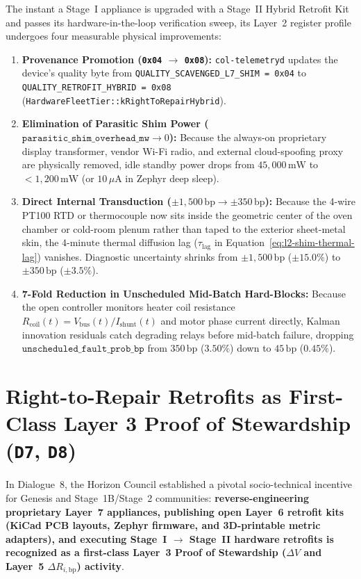 The instant a Stage~I appliance is upgraded with a Stage~II Hybrid Retrofit Kit and passes its hardware-in-the-loop verification sweep, its Layer~2 register profile undergoes four measurable physical improvements:
\begin{enumerate}
    \item \textbf{Provenance Promotion (\texttt{0x04} $\to$ \texttt{0x08}):} \texttt{col-telemetryd} updates the device's quality byte from \texttt{QUALITY\_SCAVENGED\_L7\_SHIM = 0x04} to \texttt{QUALITY\_RETROFIT\_HYBRID = 0x08} (\texttt{HardwareFleetTier::kRightToRepairHybrid}).
    \item \textbf{Elimination of Parasitic Shim Power ($\mathtt{parasitic\_shim\_overhead\_mw} \to 0$):} Because the always-on proprietary display transformer, vendor Wi-Fi radio, and external cloud-spoofing proxy are physically removed, idle standby power drops from $45{,}000\,\mathrm{mW}$ to $< 1{,}200\,\mathrm{mW}$ (or $10\,\mu\mathrm{A}$ in Zephyr deep sleep).
    \item \textbf{Direct Internal Transduction ($\pm 1{,}500\,\mathrm{bp} \to \pm 350\,\mathrm{bp}$):} Because the 4-wire PT100 RTD or thermocouple now sits inside the geometric center of the oven chamber or cold-room plenum rather than taped to the exterior sheet-metal skin, the $4\text{-minute}$ thermal diffusion lag ($\tau_{\mathrm{lag}}$ in Equation~\eqref{eq:l2-shim-thermal-lag}) vanishes. Diagnostic uncertainty shrinks from $\pm 1{,}500\,\mathrm{bp}$ ($\pm 15.0\%$) to $\pm 350\,\mathrm{bp}$ ($\pm 3.5\%$).
    \item \textbf{7-Fold Reduction in Unscheduled Mid-Batch Hard-Blocks:} Because the open controller monitors heater coil resistance $R_{\mathrm{coil}}(t) = V_{\mathrm{bus}}(t)/I_{\mathrm{shunt}}(t)$ and motor phase current directly, Kalman innovation residuals catch degrading relays before mid-batch failure, dropping $\mathtt{unscheduled\_fault\_prob\_bp}$ from $350\,\mathrm{bp}$ ($3.50\%$) down to $45\,\mathrm{bp}$ ($0.45\%$).
\end{enumerate}

\section{Right-to-Repair Retrofits as First-Class Layer 3 Proof of Stewardship (\texttt{D7}, \texttt{D8})}
\label{sec:l2-stage2-proof-of-stewardship}

In Dialogue~8, the Horizon Council established a pivotal socio-technical incentive for Genesis and Stage~1B/Stage~2 communities: \textbf{reverse-engineering proprietary Layer~7 appliances, publishing open Layer~6 retrofit kits (KiCad PCB layouts, Zephyr firmware, and 3D-printable metric adapters), and executing Stage~I $\to$ Stage~II hardware retrofits is recognized as a first-class Layer~3 Proof of Stewardship ($\Delta V$ and Layer~5 $\Delta R_{i,\mathrm{bp}}$) activity}.

